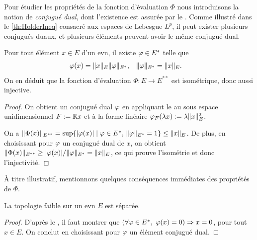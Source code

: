 Pour étudier les propriétés de la fonction d'évaluation $\Phi$ nous introduisons la notion de \emph{conjugué dual}, dont l'existence est assurée par le . Comme illustré dans le \cref{th:HolderIneq} consacré aux espaces de Lebesgue $L^p$, il peut exister plusieurs conjugués duaux, et plusieurs éléments peuvent avoir le même conjugué dual.

\begin{proposition}
\label{prop:conjugueDual}
%
	Pour tout élément  $x \in E$ d'un evn, il existe $\varphi\in E^*$ telle que 
	\begin{align*}
		\varphi(x) &= \|x\|_E \|\varphi\|_{E^*}, &
		\|\varphi\|_{E^*} &= \|x\|_E.
	\end{align*}
	On en déduit que la fonction d'évaluation $\Phi : E \to E^{**}$ est isométrique, donc aussi injective.
\end{proposition}

\begin{proof}
	On obtient un conjugué dual $\varphi$ en appliquant le  au sous espace unidimensionnel $F := \mathbb{R} x$ et à la forme linéaire $\varphi_F(\lambda x) := \lambda \|x\|^2_E$.
	
	On a $\|\Phi(x)\|_{E^{**}} = \sup \{|\varphi(x)| \mid \varphi \in E^*,\, \|\varphi\|_{E^*} = 1\} \leq \|x\|_E$. De plus, en choisissant pour $\varphi$ un conjugué dual de $x$, on obtient $\|\Phi(x)\|_{E^{**}} \geq |\varphi(x)|/\|\varphi\|_{E^*} = \|x\|_E$, ce qui prouve l'isométrie et donc l'injectivité. 
\end{proof}

À titre illustratif, mentionnons quelques conséquences immédiates des propriétés de $\Phi$.


\begin{corollary}
\label{corol:faibleSepare}
%
	La topologie faible sur un evn $E$ est séparée.
\end{corollary}

\begin{proof}
D'après le , il faut montrer que $(\forall \varphi \in E^*,\ \varphi(x)=0) \Rightarrow x=0$, pour tout $x \in E$. On conclut en choisissant pour $\varphi$ un élément conjugué dual. 
\end{proof}

